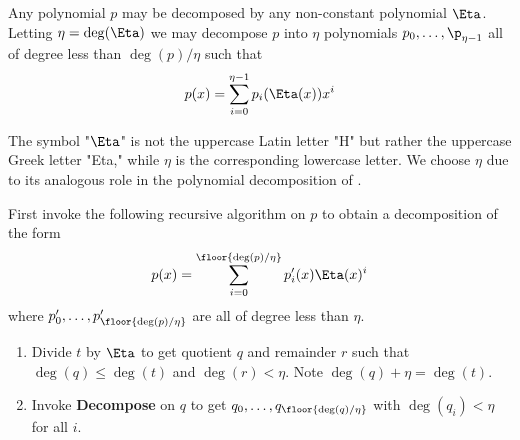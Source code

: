 

\begin{theorem}
    Any polynomial $p$ may be decomposed by any non-constant polynomial $\Eta$.
    Letting $\eta = \deg(\Eta)$ we may decompose $p$ into $\eta$ polynomials $p_0,\dots,\p_{\eta-1}$ all of degree less than $\deg(p)/\eta$ such that
    \begin{align}
        p(x) = \sum_{i=0}^{\eta-1} p_i(\Eta(x))x^i
    \end{align}
    \begin{remark}
        The symbol "$\Eta$" is not the uppercase Latin letter "H" but rather the uppercase Greek letter "Eta," while $\eta$ is the corresponding lowercase letter.
        We choose $\eta$ due to its analogous role in the polynomial decomposition of \cite{BBHR18}.
    \end{remark}

    \proof
    First invoke the following recursive algorithm on $p$ to obtain a decomposition of the form
    \begin{align}
        p(x) = \sum_{i=0}^{\floor{\deg(p)/\eta}} p'_i(x)\Eta(x)^i
    \end{align}
    where $p'_0,\dots,p'_{\floor{\deg(p)/\eta}}$ are all of degree less than $\eta$.

    \begin{enumerate}
        \textbf{Decompose}.
        \\
        Input: polynomial $t$.
        \\
        Output: polynomials $t_0,\dots,t_{\floor{\deg(t)/\eta}}$ with $\deg(t_i)<\eta$ for all $i$ such that
        \begin{align}
            t(x) = \sum_{i=0}^{\floor{\deg(t)/\eta}} t_i(x)\Eta(x)^i
        \end{align}
        
        \item
        Divide $t$ by $\Eta$ to get quotient $q$ and remainder $r$ such that $\deg(q)\leq\deg(t)$ and $\deg(r)<\eta$.
        Note $\deg(q)+\eta = \deg(t)$.

        \item
        Invoke \textbf{Decompose} on $q$ to get $q_0,\dots,q_{\floor{\deg(q)/\eta}}$ with $\deg(q_i)<\eta$ for all $i$.


\end{enumerate}
\end{theorem}
